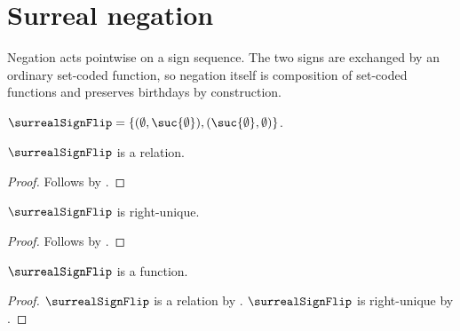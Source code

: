 

\section{Surreal negation}

Negation acts pointwise on a sign sequence.  The two signs are exchanged by
an ordinary set-coded function, so negation itself is composition of
set-coded functions and preserves birthdays by construction.

\begin{definition}\label{surreal_sign_flip}
    $\surrealSignFlip=
        \{(\emptyset,\suc{\emptyset}),
          (\suc{\emptyset},\emptyset)\}$.
\end{definition}

\begin{proposition}\label{surreal_sign_flip_is_relation}
    $\surrealSignFlip$ is a relation.
\end{proposition}
\begin{proof}
    Follows by .
\end{proof}

\begin{proposition}\label{surreal_sign_flip_rightunique}
    $\surrealSignFlip$ is right-unique.
\end{proposition}
\begin{proof}
    Follows by .
\end{proof}

\begin{proposition}\label{surreal_sign_flip_is_function}
    $\surrealSignFlip$ is a function.
\end{proposition}
\begin{proof}
    $\surrealSignFlip$ is a relation
        by .
    $\surrealSignFlip$ is right-unique
        by .
\end{proof}

